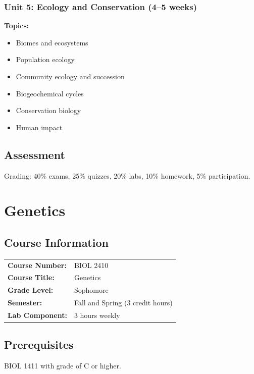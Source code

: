 \documentclass[12pt,oneside]{book}
\begin{document}
\subsection{Unit 5: Ecology and Conservation (4--5 weeks)}

\textbf{Topics:}
\begin{itemize}
    \item Biomes and ecosystems
    \item Population ecology
    \item Community ecology and succession
    \item Biogeochemical cycles
    \item Conservation biology
    \item Human impact
\end{itemize}

\section{Assessment}

Grading: 40\% exams, 25\% quizzes, 20\% labs, 10\% homework, 5\% participation.


\chapter{Genetics}

\section{Course Information}

\begin{tabular}{ll}
\textbf{Course Number:} & BIOL 2410 \\
\textbf{Course Title:} & Genetics \\
\textbf{Grade Level:} & Sophomore \\
\textbf{Semester:} & Fall and Spring (3 credit hours) \\
\textbf{Lab Component:} & 3 hours weekly \\
\end{tabular}

\section{Prerequisites}

BIOL 1411 with grade of C or higher.
\end{document}
